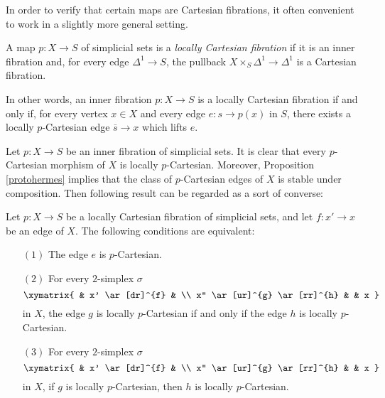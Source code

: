 In order to verify that certain maps are Cartesian fibrations, it often convenient to work in a slightly more general setting. 

\begin{definition} A map $p: X \rightarrow S$ of simplicial sets is a {\it locally Cartesian fibration} if it is an inner fibration and, for every edge $\Delta^1 \rightarrow S$, the pullback $X \times_{S} \Delta^1 \rightarrow \Delta^1$ is a Cartesian fibration.
\end{definition}

In other words, an inner fibration $p: X \rightarrow S$ is a locally Cartesian fibration if and only if, for every vertex $x \in X$ and every edge $e: s \rightarrow p(x)$ in $S$, there exists a locally $p$-Cartesian edge $\overline{s} \rightarrow x$ which lifts $e$.

Let $p: X \rightarrow S$ be an inner fibration of simplicial sets. It is clear that every $p$-Cartesian morphism of $X$ is locally $p$-Cartesian. Moreover, Proposition \ref{protohermes} implies that the class of $p$-Cartesian edges of $X$ is stable under composition. Then following result can be regarded as a sort of converse:

\begin{lemma}\label{charloccart}
Let $p: X \rightarrow S$ be a locally Cartesian fibration of simplicial sets, and let
$f: x' \rightarrow x$ be an edge of $X$. The following conditions are equivalent:
\begin{itemize}
\item[$(1)$] The edge $e$ is $p$-Cartesian.
\item[$(2)$] For every $2$-simplex $\sigma$
$$ \xymatrix{ & x' \ar[dr]^{f} & \\
x'' \ar[ur]^{g} \ar[rr]^{h} & & x }$$
in $X$, the edge $g$ is locally $p$-Cartesian if and only if the edge $h$ is locally $p$-Cartesian.
\item[$(3)$] For every $2$-simplex $\sigma$
$$ \xymatrix{ & x' \ar[dr]^{f} & \\
x'' \ar[ur]^{g} \ar[rr]^{h} & & x }$$
in $X$, if $g$ is locally $p$-Cartesian, then $h$ is locally $p$-Cartesian.
\end{itemize}
\end{lemma}

